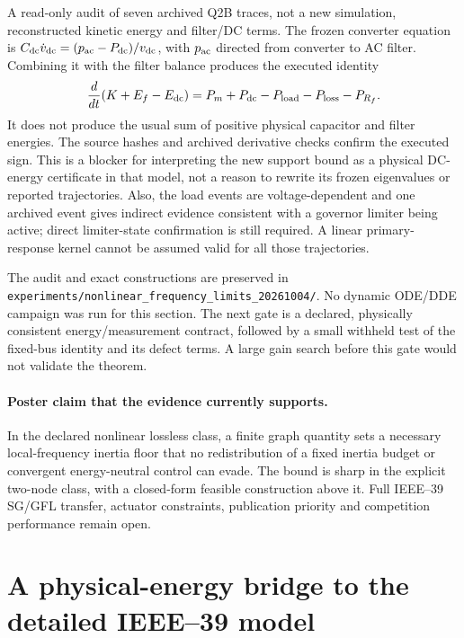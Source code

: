 \documentclass[11pt]{article}
\begin{document}
A read-only audit of seven archived Q2B traces, not a new simulation,
reconstructed kinetic energy and filter/DC terms. The frozen converter
equation is
$C_{\rm dc}\dot v_{\rm dc}=(p_{\rm ac}-P_{\rm dc})/v_{\rm dc}$,
with $p_{\rm ac}$ directed from converter to AC filter.
Combining it with the filter balance produces the executed identity
\begin{equation}
 \frac{d}{dt}(K+E_f-E_{\rm dc})
 =P_m+P_{\rm dc}-P_{\rm load}-P_{\rm loss}-P_{R_f}.
 \label{eq:nfl-executed-energy}
\end{equation}
It does not produce the usual sum of positive physical capacitor and
filter energies. The source hashes and archived derivative checks confirm
the executed sign. This is a blocker for interpreting the new support
bound as a physical DC-energy certificate in that model, not a reason to
rewrite its frozen eigenvalues or reported trajectories.
Also, the load events are voltage-dependent and one archived event gives
indirect evidence consistent with a governor limiter being active; direct
limiter-state confirmation is still required. A linear primary-response kernel cannot be
assumed valid for all those trajectories.

The audit and exact constructions are preserved in
\texttt{experiments/nonlinear\_frequency\_limits\_20261004/}.
No dynamic ODE/DDE campaign was run for this section.
The next gate is a declared, physically consistent energy/measurement
contract, followed by a small withheld test of the fixed-bus identity and
its defect terms. A large gain search before this gate would not validate
the theorem.

\paragraph{Poster claim that the evidence currently supports.}
In the declared nonlinear lossless class, a finite graph quantity sets
a necessary local-frequency inertia floor that no redistribution of a
fixed inertia budget or convergent energy-neutral control can evade.
The bound is sharp in the explicit two-node class, with a closed-form
feasible construction above it. Full IEEE--39 SG/GFL transfer, actuator
constraints, publication priority and competition performance remain open.


\section{A physical-energy bridge to the detailed IEEE--39 model}
\label{sec:physical-energy-bridge}
\end{document}
